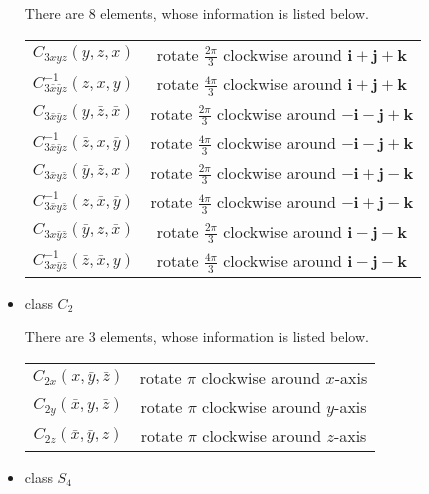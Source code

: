\documentclass[a4paper]{book}
\begin{document}
\begin{solution}
\begin{itemize}
		There are 8 elements, whose information is listed below. \vspace{-1em}
		\begin{center}
		\begin{tabular}{c|c} \hline
			$C_{3xyz}(y,z,x)$	& rotate $\frac {2\pi}3$ clockwise around $\bm{i+j+k}$\\
			$C^{-1}_{3\bar x\bar yz}(z,x,y)$ & rotate $\frac {4\pi}3$ clockwise around $\bm{i+j+k}$ \\
			$C_{3\bar x\bar yz}(y,\bar z,\bar x)$ &  rotate $\frac {2\pi}3$ clockwise around $\bm{-i-j+k}$ \\
			$C^{-1}_{3\bar x\bar yz}(\bar z,x,\bar y)$ & rotate $\frac {4\pi}3$ clockwise around $\bm{-i-j+k}$ \\
			$C_{3\bar x y \bar z}(\bar y, \bar z,x)$ &  rotate $\frac {2\pi}3$ clockwise around $\bm{-i+j-k}$ \\
			$C^{-1}_{3\bar x y \bar z}(z, \bar x,\bar y)$ & rotate $\frac {4\pi}3$ clockwise around $\bm{-i+j-k}$ \\
			$C_{3x\bar y \bar z}(\bar y, z,\bar x)$ &  rotate $\frac {2\pi}3$ clockwise around $\bm{i-j-k}$ \\
			$C^{-1}_{3x\bar y \bar z}(\bar z,\bar x,y)$ & rotate $\frac {4\pi}3$ clockwise around $\bm{i-j-k}$ \\ \hline
		\end{tabular}
		\end{center}
		
		\item class $C_2$

		There are 3 elements, whose information is listed below. \vspace{-1em}
		\begin{center}
		\begin{tabular}{c|c} \hline
			$C_{2x}(x,\bar y, \bar z)$	& rotate $\pi$ clockwise around $x$-axis\\
			$C_{2y}(\bar x, y, \bar z)$	& rotate $\pi$ clockwise around $y$-axis\\
			$C_{2z}(\bar x,\bar y, z)$	& rotate $\pi$ clockwise around $z$-axis\\ \hline
		\end{tabular}
		\end{center}
		
		\item class $S_4$


\end{itemize}
\end{solution}
\end{document}
